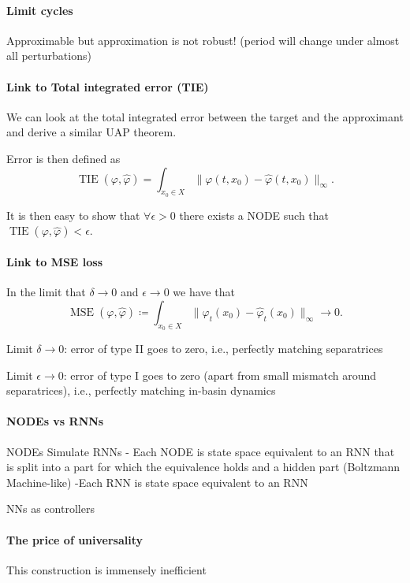\documentclass{article}
\theoremstyle{definition}
\theoremstyle{remark}
\newcounter{ct}
\begin{document}
\paragraph{Limit cycles}
Approximable but approximation is not robust! (period will change under almost all perturbations)


\paragraph{Link to Total integrated error (TIE)}
We can look at the total integrated error between the target and the approximant and derive a similar UAP theorem.

Error is then defined as 
\begin{equation}
\operatorname{TIE}(\varphi, \hat{\varphi}) = \int_{x_0\in X}\|\varphi(t,x_0) - \hat{\varphi}(t, x_0)\|_\infty.
\end{equation}

It is then easy to show that $\forall\epsilon>0$ there exists a NODE such that $\operatorname{TIE}(\varphi, \hat{\varphi})<\epsilon$.

\paragraph{Link to MSE loss}
In the limit that $\delta\rightarrow 0$ and $\epsilon\rightarrow 0$  we have that 
\[\operatorname{MSE}(\varphi, \hat{\varphi}) \coloneqq \int_{x_0\in X} \|\varphi_t(x_0) - \hat{\varphi}_t(x_0)\|_\infty \rightarrow 0.\]


Limit $\delta\rightarrow 0$: error of type II goes to zero, i.e., perfectly matching separatrices


Limit $\epsilon\rightarrow 0$: error of type I goes to zero (apart from small mismatch around separatrices), i.e., perfectly matching in-basin dynamics


\paragraph{NODEs vs RNNs}
NODEs Simulate RNNs 
- Each NODE is state space equivalent to an RNN that is split into a part for which the equivalence holds and a hidden part (Boltzmann Machine-like)
-Each RNN is state space equivalent to an RNN



NNs as controllers \citep{sontag1992neural}


\paragraph{The price of universality}
This construction is immensely inefficient
\end{document}
